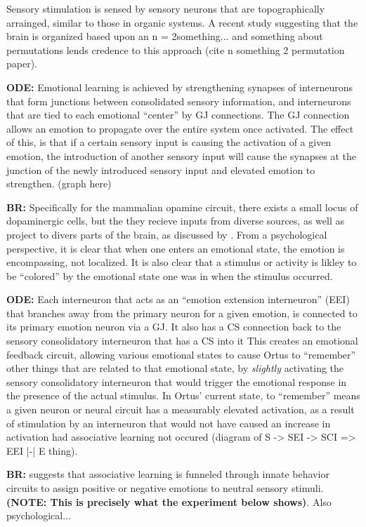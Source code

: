 \documentclass[letterpaper]{article}
\begin{document}
Sensory stimulation is sensed by sensory neurons that are topographically arrainged, similar to those in organic systems. A recent study suggesting that the brain is organized based upon an n = 2something... and something about permutations lends credence to this approach (cite n something 2 permutation paper).


\textbf{ODE:} Emotional learning is achieved by strengthening synapses of interneurons that form junctions between consolidated sensory information, and interneurons that are tied to each emotional ``center'' by GJ connections. The GJ connection allows an emotion to propagate over the entire system once activated. The effect of this, is that if a certain sensory input is causing the activation of a given emotion, the introduction of another sensory input will cause the synapses at the junction of the newly introduced sensory input and elevated emotion to strengthen. (graph here)

\textbf{BR:} Specifically for the mammalian opamine circuit, there exists a small locus of dopaminergic cells, but the they recieve inputs from diverse sources, as well as project to divers parts of the brain, as discussed by \citet{Beir2015}. From a psychological perspective, it is clear that when one enters an emotional state, the emotion is encompassing, not localized. It is also clear that a stimulus or activity is likley to be ``colored'' by the emotional state one was in when the stimulus occurred.

\textbf{ODE:} Each interneuron that acts as an ``emotion extension interneuron'' (EEI) that branches away from the primary neuron for a given emotion, is connected to its primary emotion neuron via a GJ.
It also has a CS connection back to the sensory consolidatory interneuron that has a CS into it
This creates an emotional feedback circuit, allowing various emotional states to cause Ortus to ``remember'' other things that are related to that emotional state, by \textit{slightly} activating the sensory consolidatory interneuron that would trigger the emotional response in the presence of the actual stimulus. In Ortus' current state, to ``remember'' means a given neuron or neural circuit has a measurably elevated activation, as a result of stimulation by an interneuron that would not have caused an increase in activation  had associative learning not occured (diagram of S -> SEI -> SCI => EEI |-| E thing).

\textbf{BR:} \citet{Gore2015} suggests that associative learning is funneled through innate behavior circuits to assign positive or negative emotions to neutral sensory stimuli. \textbf{(NOTE: This is precisely what the experiment below shows)}. Also psychological...
\end{document}
